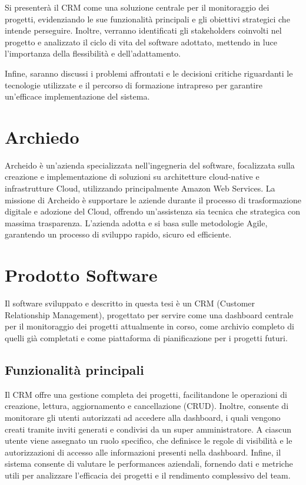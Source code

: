 \documentclass[target=bach,aauheader=,style=]{thud}
\begin{document}
\noindent Si presenterà il CRM come una soluzione centrale per il monitoraggio dei progetti, evidenziando le sue funzionalità principali e gli obiettivi strategici che intende perseguire. Inoltre, verranno identificati gli stakeholders coinvolti nel progetto e analizzato il ciclo di vita del software adottato, mettendo in luce l'importanza della flessibilità e dell'adattamento. 

\noindent Infine, saranno discussi i problemi affrontati e le decisioni critiche riguardanti le tecnologie utilizzate e il percorso di formazione intrapreso per garantire un'efficace implementazione del sistema.

\section{Archiedo}
Archeido \cite{archeido2024} è un'azienda specializzata nell'ingegneria del software, focalizzata sulla creazione e implementazione di soluzioni su architetture cloud-native e infrastrutture Cloud, utilizzando principalmente Amazon Web Services. La missione di Archeido è supportare le aziende durante il processo di trasformazione digitale e adozione del Cloud, offrendo un'assistenza sia tecnica che strategica con massima trasparenza. L'azienda adotta e si basa sulle metodologie Agile, garantendo un processo di sviluppo rapido, sicuro ed efficiente.

\section{Prodotto Software}
Il software sviluppato e descritto in questa tesi è un CRM (Customer Relationship Management), progettato per servire come una dashboard centrale per il monitoraggio dei progetti attualmente in corso, come archivio completo di quelli già completati e come piattaforma di pianificazione per i progetti futuri.

\subsection{Funzionalità principali}
Il CRM offre una gestione completa dei progetti, facilitandone le operazioni di creazione, lettura, aggiornamento e cancellazione (CRUD). Inoltre, consente di monitorare gli utenti autorizzati ad accedere alla dashboard, i quali vengono creati tramite inviti generati e condivisi da un super amministratore. A ciascun utente viene assegnato un ruolo specifico, che definisce le regole di visibilità e le autorizzazioni di accesso alle informazioni presenti nella dashboard. Infine, il sistema consente di valutare le performances aziendali, fornendo dati e metriche utili per analizzare l'efficacia dei progetti e il rendimento complessivo del team.
\end{document}
